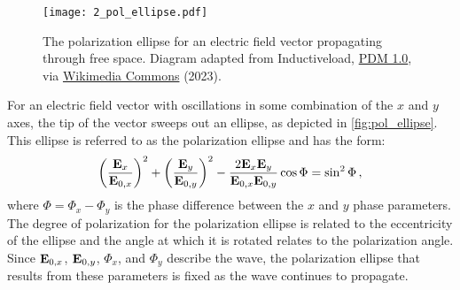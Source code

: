\begin{figure}[t]
    \centering
    \texttt{[image: 2\_pol\_ellipse.pdf]}
    \caption{
        The polarization ellipse for an electric field vector propagating through free space.
        Diagram adapted from Inductiveload, \protect\href{https://creativecommons.org/publicdomain/mark/1.0/}{PDM 1.0}, via \protect\href{https://commons.wikimedia.org/wiki/File:Polarisation_ellipse2.svg}{Wikimedia Commons} (2023).
    }
    \label{fig:pol_ellipse}
\end{figure}

For an electric field vector with oscillations in some combination of the $x$ and $y$ axes, the tip of the vector sweeps out an ellipse, as depicted in \autoref{fig:pol_ellipse}.
This ellipse is referred to as the polarization ellipse and has the form:
\begin{equation} \label{eq:pol_ellipse}
    \left( \frac{\mathbf{E}_{x}}{\mathbf{E}_{0, x}}\right)^{2} +
    \left( \frac{\mathbf{E}_{y}}{\mathbf{E}_{0, y}}\right)^{2} -
    \frac{2 \mathbf{E}_{x} \mathbf{E}_{y}}{\mathbf{E}_{0, x} \mathbf{E}_{0, y}} \cos\Phi =
    \sin^{2} \Phi\,,
\end{equation}
where $\Phi = \Phi_{x} - \Phi_{y}$ is the phase difference between the $x$ and $y$ phase parameters.
The degree of polarization for the polarization ellipse is related to the eccentricity of the ellipse and the angle at which it is rotated relates to the polarization angle.
Since $\mathbf{E}_{0, x}$, $\mathbf{E}_{0, y}$, $\Phi_{x}$, and $\Phi_{y}$ describe the wave, the polarization ellipse that results from these parameters is fixed as the wave continues to propagate.

